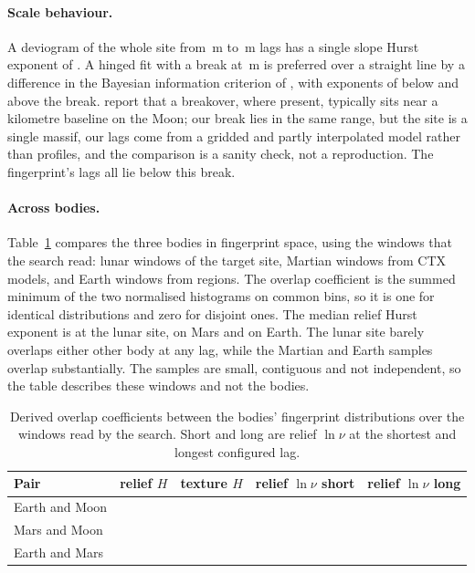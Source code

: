 \paragraph{Scale behaviour.} A deviogram of the whole site from \BreakMinLag\,m to
\BreakMaxLag\,m lags has a single slope Hurst exponent of \BreakSingleH. A hinged fit with a
break at \BreakM\,m is preferred over a straight line by a difference in the Bayesian information
criterion of \BreakDeltaBIC, with exponents of \BreakHBelow{} below and \BreakHAbove{} above the
break. \citet{rosenburg2011} report that a breakover, where present, typically sits near a
kilometre baseline on the Moon; our break lies in the same range, but the site is a single
massif, our lags come from a gridded and partly interpolated model rather than profiles, and the
comparison is a sanity check, not a reproduction. The fingerprint's lags all lie below this break.

\paragraph{Across bodies.} Table~\ref{tab:overlap} compares the three bodies in fingerprint space, using the windows that the search read: \BodyMoonWindows{} lunar windows of the target site, \BodyMarsWindows{} Martian windows from \BodyMarsGroups{} CTX models, and \BodyEarthWindows{} Earth windows from \BodyEarthGroups{} regions. The overlap coefficient is the summed minimum of the two normalised histograms on common bins, so it is one for identical distributions and zero for disjoint ones. The median relief Hurst exponent is \BodyMoonHMedian{} at the lunar site, \BodyMarsHMedian{} on Mars and \BodyEarthHMedian{} on Earth. The lunar site barely overlaps either other body at any lag, while the Martian and Earth samples overlap substantially. The samples are small, contiguous and not independent, so the table describes these windows and not the bodies.

\begin{table}[h]
\centering
\caption{Derived overlap coefficients between the bodies' fingerprint distributions over the windows read by the search. Short and long are relief $\ln \nu$ at the shortest and longest configured lag.}
\label{tab:overlap}
\footnotesize
\begin{tabular}{@{}lcccc@{}}
\toprule
Pair & relief $H$ & texture $H$ & relief $\ln \nu$ short & relief $\ln \nu$ long \\
\midrule
Earth and Moon & \OverlapEarthMoonReliefH{} & \OverlapEarthMoonTextureH{} & \OverlapEarthMoonNuShort{} & \OverlapEarthMoonNuLong{} \\
Mars and Moon & \OverlapMarsMoonReliefH{} & \OverlapMarsMoonTextureH{} & \OverlapMarsMoonNuShort{} & \OverlapMarsMoonNuLong{} \\
Earth and Mars & \OverlapEarthMarsReliefH{} & \OverlapEarthMarsTextureH{} & \OverlapEarthMarsNuShort{} & \OverlapEarthMarsNuLong{} \\
\bottomrule
\end{tabular}
\end{table}

